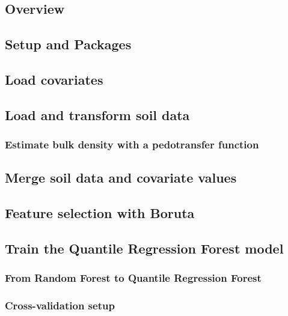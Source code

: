 \documentclass[
  10pt,
  b5paper,
  oneside]{book}
\begin{document}
\subsection{Overview}\label{overview}

\subsection{Setup and Packages}\label{setup-and-packages}

\subsection{Load covariates}\label{load-covariates}

\subsection{Load and transform soil data}\label{load-and-transform-soil-data}

\subsubsection{Estimate bulk density with a pedotransfer function}\label{estimate-bulk-density-with-a-pedotransfer-function}

\subsection{Merge soil data and covariate values}\label{merge-soil-data-and-covariate-values}

\subsection{Feature selection with Boruta}\label{feature-selection-with-boruta}

\subsection{Train the Quantile Regression Forest model}\label{train-the-quantile-regression-forest-model}

\subsubsection{From Random Forest to Quantile Regression Forest}\label{from-random-forest-to-quantile-regression-forest}

\subsubsection{Cross-validation setup}\label{cross-validation-setup}
\end{document}
